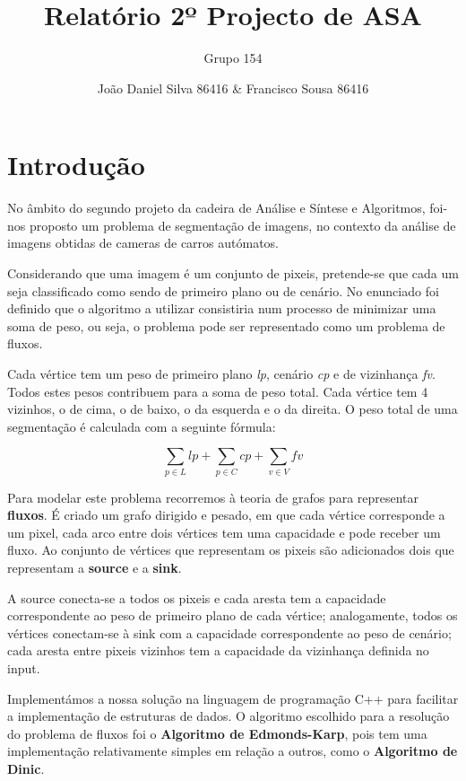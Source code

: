 \documentclass[12pt,a4paper]{article}
\author{Grupo 154 \and João Daniel Silva 86416 \& Francisco Sousa 86416}
\title{Relatório 2º Projecto de ASA}
\begin{document}
\maketitle

\section{Introdução}
No âmbito do segundo projeto da cadeira de Análise e Síntese e Algoritmos, foi-nos proposto um problema de segmentação de imagens,
no contexto da análise de imagens obtidas de cameras de carros autómatos.

Considerando que uma imagem é um conjunto de pixeis, pretende-se que cada um seja classificado como sendo de primeiro plano ou de
cenário. No enunciado foi definido que o algoritmo a utilizar consistiria num processo de minimizar uma soma de peso, ou seja, o
problema pode ser representado como um problema de fluxos.

Cada vértice tem um peso de primeiro plano \textit{lp}, cenário \textit{cp} e de
vizinhança \textit{fv}. Todos estes pesos contribuem para a soma de peso total. Cada vértice tem 4 vizinhos, o de cima, o de baixo, o
da esquerda e o da direita. O peso total de uma segmentação é calculada com a seguinte fórmula:

$$\sum_{p \in L} \textit{lp} + \sum_{p \in C} \textit{cp} + \sum_{v \in V} \textit{fv} $$

Para modelar este problema recorremos à teoria de grafos para representar \textbf{fluxos}. É criado um grafo dirigido e pesado, em que cada
vértice corresponde a um pixel, cada arco entre dois vértices tem uma capacidade e pode receber um fluxo. Ao conjunto de vértices
que representam os pixeis são adicionados dois que representam a \textbf{source} e a \textbf{sink}.

A source conecta-se a todos os pixeis e cada
aresta tem a capacidade correspondente ao peso de primeiro plano de cada vértice; analogamente, todos os vértices conectam-se
à sink com a capacidade correspondente ao peso de cenário; cada aresta entre pixeis vizinhos tem a capacidade da vizinhança
definida no input.

Implementámos a nossa solução na linguagem de programação C++ para facilitar a implementação de estruturas de dados. O
algoritmo escolhido para a resolução do problema de fluxos foi o \textbf{Algoritmo de Edmonds-Karp}, pois tem uma implementação relativamente
simples em relação a outros, como o \textbf{Algoritmo de Dinic}.
\end{document}
